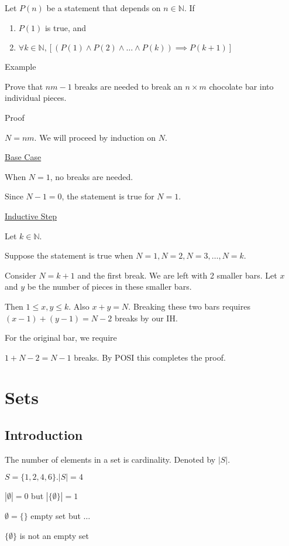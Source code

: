 \documentclass{article}
\begin{document}
Let $P(n)$ be a statement that depends on $n \in \mathbb{N}$. If 
\begin{enumerate}
    \item $P(1)$ is true, and 
    \item $\forall k \in \mathbb{N}, [(P(1) \wedge P(2) \wedge \ldots \wedge P(k)) \implies P(k+1)]$
\end{enumerate}

Example

Prove that $nm - 1$ breaks are needed to break an $n \times m$ chocolate bar into individual pieces.

Proof

$N = nm$. We will proceed by induction on $N$.

\underline{Base Case}

When $N = 1$, no breaks are needed. 

Since $N-1 = 0$, the statement is true for $N=1$.

\underline{Inductive Step}

Let $k \in \mathbb{N}$.

Suppose the statement is true when $N = 1, N = 2, N = 3, \ldots, N = k$. 

Consider $N = k+1$ and the first break. We are left with 2 smaller bars. Let $x$ and $y$ be the number of pieces in these smaller bars. 

Then $1 \le x, y \le k$. Also $x + y = N$. Breaking these two bars requires $(x-1)+(y-1) = N-2$ breaks by our IH. 

For the original bar, we require

$1 + N - 2 = N - 1$ breaks. By POSI this completes the proof.


\section{Sets}


\subsection{Introduction}

The number of elements in a set is cardinality. Denoted by $|S|$.

$S = \{1,2,4,6\}. |S| = 4$

$|\emptyset| = 0$ but $|\{\emptyset\}| = 1$

$\emptyset = \{\}$ empty set but $\ldots$

$\{\emptyset\}$ is not an empty set
\end{document}
